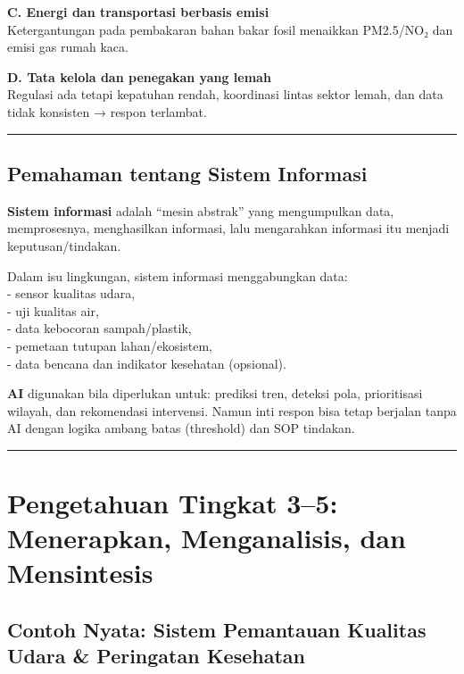 \documentclass[
  letterpaper,
  DIV=11,
  numbers=noendperiod]{scrreprt}
\begin{document}
\textbf{C. Energi dan transportasi berbasis emisi}\\
Ketergantungan pada pembakaran bahan bakar fosil menaikkan PM2.5/NO₂ dan
emisi gas rumah kaca.

\textbf{D. Tata kelola dan penegakan yang lemah}\\
Regulasi ada tetapi kepatuhan rendah, koordinasi lintas sektor lemah,
dan data tidak konsisten → respon terlambat.

\begin{center}\rule{0.5\linewidth}{0.5pt}\end{center}

\subsection{Pemahaman tentang Sistem
Informasi}\label{pemahaman-tentang-sistem-informasi}

\textbf{Sistem informasi} adalah ``mesin abstrak'' yang mengumpulkan
data, memprosesnya, menghasilkan informasi, lalu mengarahkan informasi
itu menjadi keputusan/tindakan.

Dalam isu lingkungan, sistem informasi menggabungkan data:\\
- sensor kualitas udara,\\
- uji kualitas air,\\
- data kebocoran sampah/plastik,\\
- pemetaan tutupan lahan/ekosistem,\\
- data bencana dan indikator kesehatan (opsional).

\textbf{AI} digunakan bila diperlukan untuk: prediksi tren, deteksi
pola, prioritisasi wilayah, dan rekomendasi intervensi. Namun inti
respon bisa tetap berjalan tanpa AI dengan logika ambang batas
(threshold) dan SOP tindakan.

\begin{center}\rule{0.5\linewidth}{0.5pt}\end{center}

\section{Pengetahuan Tingkat 3--5: Menerapkan, Menganalisis, dan
Mensintesis}\label{pengetahuan-tingkat-35-menerapkan-menganalisis-dan-mensintesis}

\subsection{Contoh Nyata: Sistem Pemantauan Kualitas Udara \& Peringatan
Kesehatan}\label{contoh-nyata-sistem-pemantauan-kualitas-udara-peringatan-kesehatan}
\end{document}
